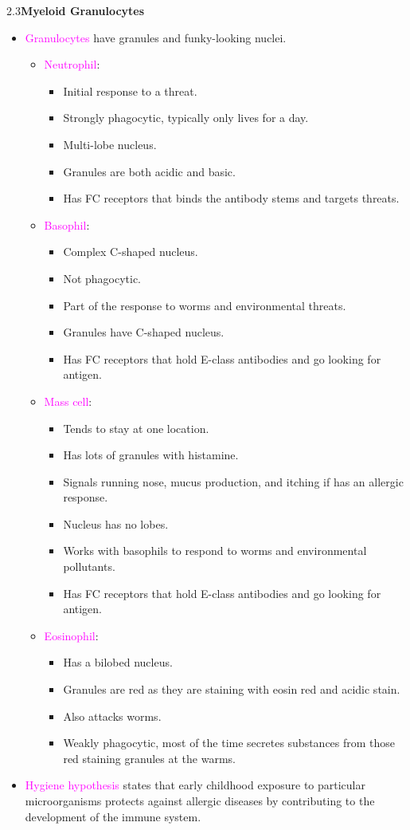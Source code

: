 \documentclass[UTF8]{book}
\newcommand{\concept}[1]{\textcolor{magenta}{#1}}
\begin{document}
2.3\quad \textbf{Myeloid Granulocytes}
\begin{itemize}
\item \concept{Granulocytes} have granules and funky-looking nuclei.
\begin{itemize}
	\item \concept{Neutrophil}:
	\begin{itemize}
		\item Initial response to a threat.
		\item Strongly phagocytic, typically only lives for a day.	
		\item Multi-lobe nucleus.
		\item Granules are both acidic and basic.
		\item Has FC receptors that binds the antibody stems and targets threats.
	\end{itemize}
	\item \concept{Basophil}:
	\begin{itemize}
		\item Complex C-shaped nucleus.
		\item Not phagocytic.
		\item Part of the response to worms and environmental threats.
		\item Granules have C-shaped nucleus.
		\item Has FC receptors that hold E-class antibodies and go looking for antigen.
	\end{itemize}
	\item \concept{Mass cell}:
	\begin{itemize}
		\item Tends to stay at one location.
		\item Has lots of granules with histamine.
		\item Signals running nose, mucus production, and itching if has an allergic response.
		\item Nucleus has no lobes.
		\item Works with basophils to respond to worms and environmental pollutants.
		\item Has FC receptors that hold E-class antibodies and go looking for antigen.
	\end{itemize}
	\item \concept{Eosinophil}:
	\begin{itemize}
		\item Has a bilobed nucleus.
		\item Granules are red as they are staining with eosin red and acidic stain.
		\item Also attacks worms.
		\item Weakly phagocytic, most of the time secretes substances from those red staining granules at the warms.
	\end{itemize}
\end{itemize}
\item \concept{Hygiene hypothesis} states that early childhood exposure to particular microorganisms protects against allergic diseases by contributing to the development of the immune system.
\end{itemize}
\end{document}
